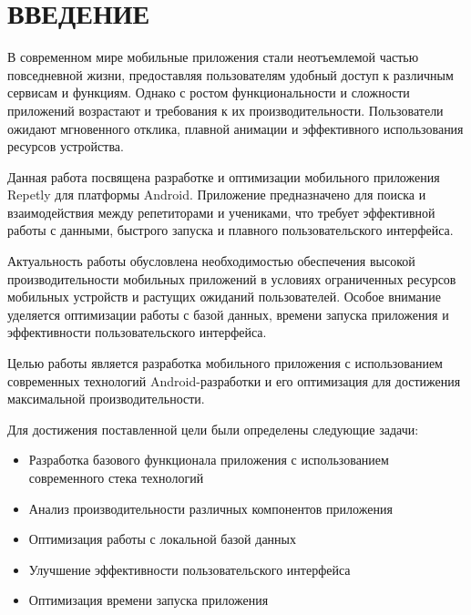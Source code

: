 \documentclass[14pt, russian]{scrartcl}
\newcommand{\anonsection}[1]{\cleardoublepage
\phantomsection
\addcontentsline{toc}{section}{\protect\numberline{}#1}
\section*{#1}\vspace*{2.5ex} %
}
\begin{document}
\begin{titlepage}
\begin{center}


\end{center}

\end{titlepage}

\setlength{\tabcolsep}{3pt}
\newpage
\setcounter{page}{2}
\renewcommand\contentsname{\hfill{\normalfont{СОДЕРЖАНИЕ}}\hfill}  %
\tableofcontents
\newpage
\anonsection{ВВЕДЕНИЕ}

В современном мире мобильные приложения стали неотъемлемой частью повседневной жизни, предоставляя пользователям удобный доступ к различным сервисам и функциям. Однако с ростом функциональности и сложности приложений возрастают и требования к их производительности. Пользователи ожидают мгновенного отклика, плавной анимации и эффективного использования ресурсов устройства.

Данная работа посвящена разработке и оптимизации мобильного приложения Repetly для платформы Android. Приложение предназначено для поиска и взаимодействия между репетиторами и учениками, что требует эффективной работы с данными, быстрого запуска и плавного пользовательского интерфейса.

Актуальность работы обусловлена необходимостью обеспечения высокой производительности мобильных приложений в условиях ограниченных ресурсов мобильных устройств и растущих ожиданий пользователей. Особое внимание уделяется оптимизации работы с базой данных, времени запуска приложения и эффективности пользовательского интерфейса.

Целью работы является разработка мобильного приложения с использованием современных технологий Android-разработки и его оптимизация для достижения максимальной производительности.

Для достижения поставленной цели были определены следующие задачи:
\begin{itemize}
\item Разработка базового функционала приложения с использованием современного стека технологий
\item Анализ производительности различных компонентов приложения
\item Оптимизация работы с локальной базой данных
\item Улучшение эффективности пользовательского интерфейса
\item Оптимизация времени запуска приложения
\end{itemize}
\end{document}
